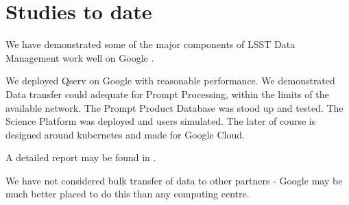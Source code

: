 \section{Studies to date}
We have demonstrated some of the major components of \gls{LSST} \gls{Data Management} work well on Google  .

We deployed \gls{Qserv} on Google with reasonable performance.
We demonstrated Data transfer  could adequate for \gls{Prompt Processing}, within the limits of the available network.
The Prompt Product Database was  stood up and tested.  The  \gls{Science Platform} was deployed and users simulated.
The later of course is designed around kubernetes and made for Google Cloud.

A detailed report may be found in .

We have not considered bulk transfer of data to other partners - Google may be much better placed to do this than any computing centre.
